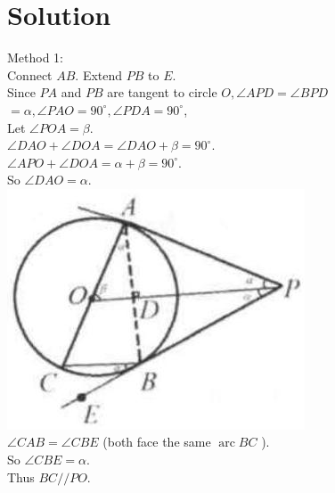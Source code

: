 \documentclass{article}
\begin{document}
\section*{Solution}
Method 1:\\
Connect \(A B\). Extend \(P B\) to \(E\).\\
Since \(P A\) and \(P B\) are tangent to circle \(O, \angle A P D=\angle B P D\) \(=\alpha, \angle P A O=90^{\circ}, \angle P D A=90^{\circ}\),\\
Let \(\angle P O A=\beta\).\\
\(\angle D A O+\angle D O A=\angle D A O+\beta=90^{\circ}\).\\
\(\angle A P O+\angle D O A=\alpha+\beta=90^{\circ}\).\\
So \(\angle D A O=\alpha\).\\
\centering
\includegraphics[width=\textwidth]{images/171(1).jpg}\\
\(\angle C A B=\angle C B E\) (both face the same \(\operatorname{arc} B C\) ).\\
So \(\angle C B E=\alpha\).\\
Thus \(B C / / P O\).
\end{document}
